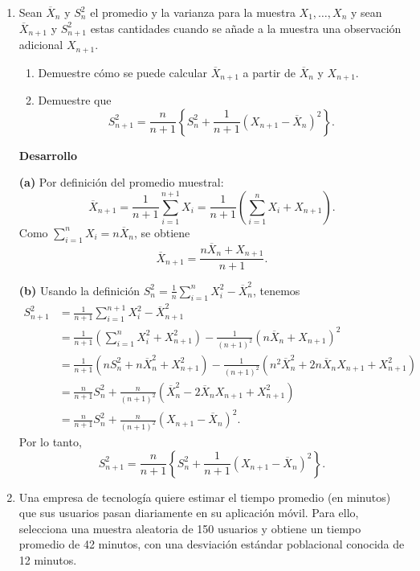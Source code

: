 \documentclass[letterpaper,11pt]{article}
\begin{document}
 
\begin{enumerate}



\item Sean $\overline{X}_n$ y $S_n^2$ el promedio y la varianza para la muestra $X_1, \ldots, X_n$ y sean $\overline{X}_{n+1}$ y $S_{n+1}^2$ estas cantidades cuando se añade a la muestra una observación adicional $X_{n+1}$.
    \begin{enumerate}
        \item[(a)] Demuestre cómo se puede calcular $\overline{X}_{n+1}$ a partir de $\overline{X}_n$ y $X_{n+1}$.
        \item[(b)] Demuestre que
        \[
        S_{n+1}^2 = \frac{n}{n+1} \left\{ S_n^2 + \frac{1}{n+1} \left( X_{n+1} - \overline{X}_n \right)^2 \right\}.
        \]
    \end{enumerate}

\textbf{Desarrollo}

\textbf{(a)} Por definición del promedio muestral:
\[
\overline{X}_{n+1}
= \frac{1}{n+1}\sum_{i=1}^{n+1}X_i
= \frac{1}{n+1}\left(\sum_{i=1}^{n}X_i + X_{n+1}\right).
\]
Como $\sum_{i=1}^{n}X_i=n\overline{X}_n$, se obtiene
\[
\boxed{\overline{X}_{n+1}=\frac{n\overline{X}_n+X_{n+1}}{n+1}.}
\]

\textbf{(b)} Usando la definición $S_n^2=\frac{1}{n}\sum_{i=1}^n X_i^2-\overline{X}_n^2$, tenemos
\begin{align*}
S_{n+1}^2
&= \frac{1}{n+1}\sum_{i=1}^{n+1}X_i^2-\overline{X}_{n+1}^2\\
&= \frac{1}{n+1}\left(\sum_{i=1}^{n}X_i^2+X_{n+1}^2\right)
-\frac{1}{(n+1)^2}\left(n\overline{X}_n+X_{n+1}\right)^2\\
&= \frac{1}{n+1}\left(nS_n^2+n\overline{X}_n^2+X_{n+1}^2\right)
-\frac{1}{(n+1)^2}\left(n^2\overline{X}_n^2+2n\overline{X}_nX_{n+1}+X_{n+1}^2\right)\\
&= \frac{n}{n+1}S_n^2
+\frac{n}{(n+1)^2}\left(\overline{X}_n^2-2\overline{X}_nX_{n+1}+X_{n+1}^2\right)\\
&= \frac{n}{n+1}S_n^2+\frac{n}{(n+1)^2}\left(X_{n+1}-\overline{X}_n\right)^2.
\end{align*}
Por lo tanto,
\[
\boxed{
S_{n+1}^2 = \frac{n}{n+1} \left\{ S_n^2 + \frac{1}{n+1} \left( X_{n+1} - \overline{X}_n \right)^2 \right\}.
}
\]



\item Una empresa de tecnología quiere estimar el tiempo promedio (en minutos) que sus usuarios pasan diariamente en su aplicación móvil. Para ello, selecciona una muestra aleatoria de 150 usuarios y obtiene un tiempo promedio de 42 minutos, con una desviación estándar poblacional conocida de 12 minutos.


\end{enumerate}
\end{document}
